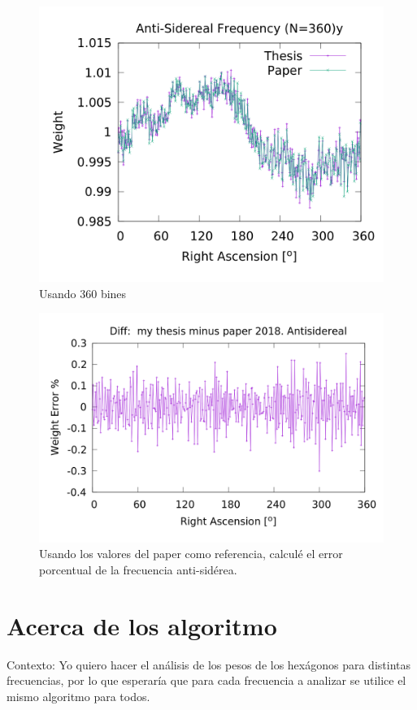 	\begin{figure}[H]
	\centering
	\includegraphics[width=0.8\linewidth]{Graficos/anti_my_and_paper_in_360.png}
	\caption{Usando 360 bines}
	\label{fig:anti_360}
	\end{figure}


	\begin{figure}[H]
	\centering
	\includegraphics[width=0.8\linewidth]{Graficos/anti_my_and_paper_in_360_error.png}
	\caption{Usando los valores del paper como referencia, calculé el error porcentual de la frecuencia anti-sidérea.}
	\label{fig:error_360_anti}
	\end{figure}



\section{Acerca de los algoritmo}

	Contexto: Yo quiero hacer el análisis de los pesos de los hexágonos para distintas frecuencias, por lo que esperaría que para cada frecuencia a analizar se utilice el mismo algoritmo para todos.

